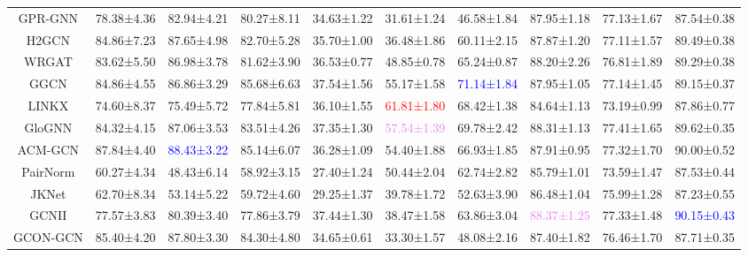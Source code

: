 \documentclass{article}
\theoremstyle{plain}
\theoremstyle{definition}
\theoremstyle{remark}
\newcommand{\std}{\scriptsize{}}
\newcommand{\BEST}[1]{\textcolor{red}{#1}}
\newcommand{\SECOND}[1]{\textcolor{blue}{#1}}
\newcommand{\THIRD}[1]{\textcolor{violet}{#1}}
\begin{document}
\begin{table}[ht]
\begin{tabular}{c ccccccccc}
        GPR-GNN	    & 78.38\std{±4.36} & 82.94\std{±4.21} & 80.27\std{±8.11} & 34.63\std{±1.22} & 31.61\std{±1.24} & 46.58\std{±1.84} & 87.95\std{±1.18} & 77.13\std{±1.67} & 87.54\std{±0.38}\\
        H2GCN	    & 84.86\std{±7.23} & 87.65\std{±4.98} & 82.70\std{±5.28} & 35.70\std{±1.00} & 36.48\std{±1.86} & 60.11\std{±2.15} & 87.87\std{±1.20} & 77.11\std{±1.57} & 89.49\std{±0.38}\\
        WRGAT       & 83.62\std{±5.50} & {86.98\std{±3.78}} & 81.62\std{±3.90} & 36.53\std{±0.77} & 48.85\std{±0.78} & 65.24\std{±0.87} & 88.20\std{±2.26} & 76.81\std{±1.89} & 89.29\std{±0.38}\\
        GGCN        & 84.86\std{±4.55} & 86.86\std{±3.29} & 85.68\std{±6.63} & 37.54\std{±1.56} & 55.17\std{±1.58} & \SECOND{71.14\std{±1.84}} & 87.95\std{±1.05} & 77.14\std{±1.45} & 89.15\std{±0.37}\\
        LINKX       & 74.60\std{±8.37} & 75.49\std{±5.72} & 77.84\std{±5.81} & 36.10\std{±1.55} & \BEST{61.81\std{±1.80}} & 68.42\std{±1.38} & 84.64\std{±1.13} & 73.19\std{±0.99} & 87.86\std{±0.77}\\
        GloGNN      & 84.32\std{±4.15} & 87.06\std{±3.53} & 83.51\std{±4.26} & 37.35\std{±1.30} & \THIRD{57.54\std{±1.39}} & 69.78\std{±2.42} & 88.31\std{±1.13} & 77.41\std{±1.65} & 89.62\std{±0.35}\\
        ACM-GCN	    & 87.84\std{±4.40} & \SECOND{88.43\std{±3.22}} & 85.14\std{±6.07} & 36.28\std{±1.09} & 54.40\std{±1.88} & 66.93\std{±1.85} & 87.91\std{±0.95} & 77.32\std{±1.70} & 90.00\std{±0.52}\\
        \midrule
        PairNorm	& 60.27\std{±4.34} & 48.43\std{±6.14} & 58.92\std{±3.15} & 27.40\std{±1.24} & 50.44\std{±2.04} & 62.74\std{±2.82} & 85.79\std{±1.01} & 73.59\std{±1.47} & 87.53\std{±0.44}\\
        JKNet   	& 62.70\std{±8.34} & 53.14\std{±5.22} & 59.72\std{±4.60} & 29.25\std{±1.37} & 39.78\std{±1.72} & 52.63\std{±3.90} & 86.48\std{±1.04} & 75.99\std{±1.28} & 87.23\std{±0.55}\\
        GCNII	    & 77.57\std{±3.83} & 80.39\std{±3.40} & 77.86\std{±3.79} & 37.44\std{±1.30} & 38.47\std{±1.58} & 63.86\std{±3.04} & \THIRD{88.37\std{±1.25}} & 77.33\std{±1.48} & \SECOND{90.15\std{±0.43}}\\
        GCON-GCN    & 85.40\std{±4.20} & 87.80\std{±3.30} & 84.30\std{±4.80} & 34.65\std{±0.61} & 33.30\std{±1.57} & 48.08\std{±2.16} & 87.40\std{±1.82} & 76.46\std{±1.70} & 87.71\std{±0.35}\\

\end{tabular}
\end{table}
\end{document}
